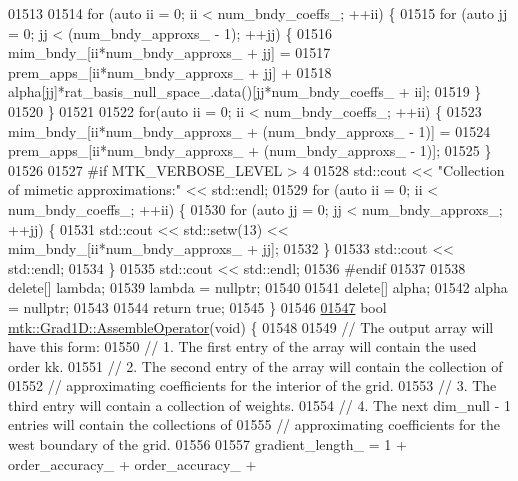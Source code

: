 \begin{DoxyCode}
{{01513 
01514   \textcolor{keywordflow}{for} (\textcolor{keyword}{auto} ii = 0; ii < num\_bndy\_coeffs\_; ++ii) \{
01515     \textcolor{keywordflow}{for} (\textcolor{keyword}{auto} jj = 0; jj < (num\_bndy\_approxs\_ - 1); ++jj) \{
01516       mim\_bndy\_[ii*num\_bndy\_approxs\_ + jj] =
01517         prem\_apps\_[ii*num\_bndy\_approxs\_ + jj] +
01518         alpha[jj]*rat\_basis\_null\_space\_.data()[jj*num\_bndy\_coeffs\_ + ii];
01519     \}
01520   \}
01521 
01522   \textcolor{keywordflow}{for}(\textcolor{keyword}{auto} ii = 0; ii < num\_bndy\_coeffs\_; ++ii) \{
01523     mim\_bndy\_[ii*num\_bndy\_approxs\_ + (num\_bndy\_approxs\_ - 1)] =
01524       prem\_apps\_[ii*num\_bndy\_approxs\_ + (num\_bndy\_approxs\_ - 1)];
01525   \}
01526 
01527 \textcolor{preprocessor}{  #if MTK\_VERBOSE\_LEVEL > 4}
01528   std::cout << \textcolor{stringliteral}{"Collection of mimetic approximations:"} << std::endl;
01529   \textcolor{keywordflow}{for} (\textcolor{keyword}{auto} ii = 0; ii < num\_bndy\_coeffs\_; ++ii) \{
01530     \textcolor{keywordflow}{for} (\textcolor{keyword}{auto} jj = 0; jj < num\_bndy\_approxs\_; ++jj) \{
01531       std::cout << std::setw(13) << mim\_bndy\_[ii*num\_bndy\_approxs\_ + jj];
01532     \}
01533     std::cout << std::endl;
01534   \}
01535   std::cout << std::endl;
01536 \textcolor{preprocessor}{  #endif}
01537 
01538   \textcolor{keyword}{delete}[] lambda;
01539   lambda = \textcolor{keyword}{nullptr};
01540 
01541   \textcolor{keyword}{delete}[] alpha;
01542   alpha = \textcolor{keyword}{nullptr};
01543 
01544   \textcolor{keywordflow}{return} \textcolor{keyword}{true};
01545 \}
01546 
\hypertarget{mtk__grad__1d_8cc_source_l01547}{}\hyperlink{classmtk_1_1Grad1D_a4eb4d363506b8c64b2bb18a318bbd259}{01547} \textcolor{keywordtype}{bool} \hyperlink{classmtk_1_1Grad1D_a4eb4d363506b8c64b2bb18a318bbd259}{mtk::Grad1D::AssembleOperator}(\textcolor{keywordtype}{void}) \{
01548 
01549   \textcolor{comment}{// The output array will have this form:}
01550   \textcolor{comment}{// 1. The first entry of the array will contain the used order kk.}
01551   \textcolor{comment}{// 2. The second entry of the array will contain the collection of}
01552   \textcolor{comment}{// approximating coefficients for the interior of the grid.}
01553   \textcolor{comment}{// 3. The third entry will contain a collection of weights.}
01554   \textcolor{comment}{// 4. The next dim\_null - 1 entries will contain the collections of}
01555   \textcolor{comment}{// approximating coefficients for the west boundary of the grid.}
01556 
01557   gradient\_length\_ = 1 + order\_accuracy\_ + order\_accuracy\_ +
}}
\end{DoxyCode}
